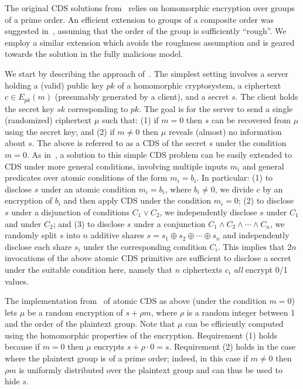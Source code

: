 \documentclass[11pt]{article}
\begin{document}
The original CDS solutions from~\cite{AIR01}  relies on homomorphic
encryption over groups of a prime order. An efficient extension to
groups of a composite order was suggested in~\cite{L05}, assuming
that the order of the group is sufficiently ``rough''. We employ a
similar extension which avoids the roughness assumption and is
geared towards the solution in the fully malicious model.

We start by describing the approach of~\cite{AIR01}. The simplest
setting involves a server holding a (valid) public key $pk$ of a
homomorphic cryptosystem, a ciphertext $c\in E_{pk}(m)$ (presumably
generated by a client), and a secret $s$. The client holds the
secret key $sk$ corresponding to $pk$. The goal is for the server
to send a single (randomized) ciphertext $\mu$ such that: (1) if
$m=0$ then $s$ can be recovered from $\mu$ using the secret key;
and (2) if $m\neq 0$ then $\mu$ reveals (almost) no information
about $s$. The above is referred to as a CDS of the secret $s$
under the condition $m=0$. As in~\cite{GIKM,AIR01}, a solution to
this simple CDS problem can be easily extended to CDS under more
general conditions, involving multiple inputs $m_i$ and general
predicates over atomic conditions of the form $m_i=b_i$. In
particular: (1) to disclose $s$ under an atomic condition
$m_i=b_i$, where $b_i\neq 0$, we divide $c$ by an encryption of
$b_i$ and then apply CDS under the condition $m_i=0$; (2) to
disclose $s$ under a disjunction of conditions $C_1\vee C_2$, we
independently disclose $s$ under $C_1$ and under $C_2$; and (3) to
disclose $s$ under a conjunction $C_1\wedge C_2\wedge \cdots \wedge
C_n$, we randomly split $s$ into $n$ additive shares $s=s_1\oplus
s_2\oplus\cdots\oplus s_n$ and independently disclose each share
$s_i$ under the corresponding condition $C_i$. This implies that
$2n$ invocations of the above atomic CDS primitive are sufficient
to disclose a secret under the suitable condition here, namely that
$n$ ciphertexts $c_i$ {\em all} encrypt 0/1 values.

The implementation from~\cite{AIR01} of atomic CDS as above (under
the condition $m=0$) lets $\mu$ be a random encryption of $s+\rho
m$, where $\rho$ is a random integer between 1 and the order of the
plaintext group. Note that $\mu$ can be efficiently computed using
the homomorphic properties of the encryption. Requirement (1) holds
because if $m=0$ then $\mu$ encrypts $s+\rho\cdot 0=s$. Requirement
(2) holds in the case where the plaintext group is of a prime
order; indeed, in this case if $m\neq 0$ then $\rho m$ is uniformly
distributed over the plaintext group and can thus be used to hide
$s$.
\end{document}
